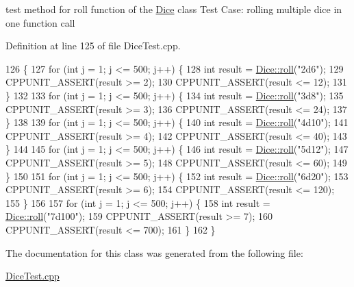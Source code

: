 test method for roll function of the \hyperlink{class_dice}{Dice} class Test Case\+: rolling multiple dice in one function call 

Definition at line 125 of file Dice\+Test.\+cpp.


\begin{DoxyCode}
126 \{
127     \textcolor{keywordflow}{for} (\textcolor{keywordtype}{int} j = 1; j <= 500; j++) \{
128         \textcolor{keywordtype}{int} result = \hyperlink{class_dice_a4923bdf22040579e6e071e1e987916c2}{Dice::roll}(\textcolor{stringliteral}{"2d6"});
129         CPPUNIT\_ASSERT(result >= 2);
130         CPPUNIT\_ASSERT(result <= 12);
131     \}
132 
133     \textcolor{keywordflow}{for} (\textcolor{keywordtype}{int} j = 1; j <= 500; j++) \{
134         \textcolor{keywordtype}{int} result = \hyperlink{class_dice_a4923bdf22040579e6e071e1e987916c2}{Dice::roll}(\textcolor{stringliteral}{"3d8"});
135         CPPUNIT\_ASSERT(result >= 3);
136         CPPUNIT\_ASSERT(result <= 24);
137     \}
138 
139     \textcolor{keywordflow}{for} (\textcolor{keywordtype}{int} j = 1; j <= 500; j++) \{
140         \textcolor{keywordtype}{int} result = \hyperlink{class_dice_a4923bdf22040579e6e071e1e987916c2}{Dice::roll}(\textcolor{stringliteral}{"4d10"});
141         CPPUNIT\_ASSERT(result >= 4);
142         CPPUNIT\_ASSERT(result <= 40);
143     \}
144 
145     \textcolor{keywordflow}{for} (\textcolor{keywordtype}{int} j = 1; j <= 500; j++) \{
146         \textcolor{keywordtype}{int} result = \hyperlink{class_dice_a4923bdf22040579e6e071e1e987916c2}{Dice::roll}(\textcolor{stringliteral}{"5d12"});
147         CPPUNIT\_ASSERT(result >= 5);
148         CPPUNIT\_ASSERT(result <= 60);
149     \}
150 
151     \textcolor{keywordflow}{for} (\textcolor{keywordtype}{int} j = 1; j <= 500; j++) \{
152         \textcolor{keywordtype}{int} result = \hyperlink{class_dice_a4923bdf22040579e6e071e1e987916c2}{Dice::roll}(\textcolor{stringliteral}{"6d20"});
153         CPPUNIT\_ASSERT(result >= 6);
154         CPPUNIT\_ASSERT(result <= 120);
155     \}
156 
157     \textcolor{keywordflow}{for} (\textcolor{keywordtype}{int} j = 1; j <= 500; j++) \{
158         \textcolor{keywordtype}{int} result = \hyperlink{class_dice_a4923bdf22040579e6e071e1e987916c2}{Dice::roll}(\textcolor{stringliteral}{"7d100"});
159         CPPUNIT\_ASSERT(result >= 7);
160         CPPUNIT\_ASSERT(result <= 700);
161     \}
162 \}
\end{DoxyCode}


The documentation for this class was generated from the following file\+:\begin{DoxyCompactItemize}
\item 
\hyperlink{_dice_test_8cpp}{Dice\+Test.\+cpp}\end{DoxyCompactItemize}
